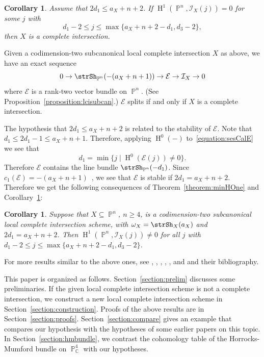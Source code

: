 \documentclass[11pt,a4paper]{amsart}
\theoremstyle{plain}
\newtheorem{corollary}[equation]{Corollary}
\theoremstyle{definition}
\newcommand{\calE}{\mathcal E}
\newcommand{\calI}{\mathcal I}
\newcommand{\complex}{\mathbb{C}}
\DeclareMathOperator{\projective}{\mathbb{P}}
\DeclareMathOperator{\homology}{H}
\begin{document}
\begin{corollary}
\label{corollary:gap}
Assume that $2d_1 \leq a_X+n+2$. If $\homology^1(\projective^n, \calI_X(j))
= 0$ for some $j$ with 
\[
d_1-2 \leq j \leq  \max \{ a_X+n+2-d_1, d_3-2\},
\]
then $X$ is a complete intersection.
\end{corollary}

Given a codimension-two subcanonical local complete intersection $X$ as
above, we have an exact sequence
\begin{equation}
\label{equation:sesCalE} 
0 \to \strSh_{\projective^n}(-(a_X+n+1)) \to \calE \to \calI_X \to 0
\end{equation}
where $\calE$ is a rank-two vector bundle on $\projective^n$.
(See Proposition~\ref{proposition:lcisubcan}.) 
$\calE$ splits if and only if $X$ is a complete intersection.

The hypothesis that $2d_1 \leq a_X + n+2$ is related to the stability of
$\calE$.
Note that $d_1 \leq 2d_1-1 \leq a_X + n + 1$.
Therefore, applying $\homology^0(-)$ to~\eqref{equation:sesCalE} we see
that 
\[
d_1 = \min \{j \mid \homology^0(\calE(j)) \neq 0 \}.
\]
Therefore $\calE$ contains the line bundle $\strSh_{\projective^n}(-d_1)$.
Since $c_1(\calE) = -(a_X+n+1)$~\cite[Chapter~1, 5.1.1]{OSSvb2011},
we see that $\calE$ is stable if $2d_1 = a_X+n+2$.
Therefore we get the following consequences of
Theorem~\ref{theorem:minHOne} and Corollary~\ref{corollary:gap}:

\begin{corollary}
%
Suppose that $X \subseteq \projective^n$, $n \geq 4$,
is a codimension-two subcanonical
local complete intersection scheme, with $\omega_X = \strSh_X(a_X)$
and $2d_1 = a_X+n+2$. Then 
$\homology^1(\projective^n, \calI_X(j ) ) \neq 0$ 
for all $j$ with $d_1-2 \leq j \leq  \max \{ a_X+n+2-d_1, d_3-2\}$.
\end{corollary}

For more results similar to the above ones, see 
\cite{ElliaFrancoCodimTwo2002},
\cite{ElliaSurvey2000},
\cite{ElliaSartikBuchs1999},
\cite{ChiantiniVallabregaSubcanCurves1983},
\cite{ChiantiniVallabregaSubcanCurves1987},
\cite{ChiantiniVBReflShLowCodimVars2006} and
\cite{KumarRaoBuchsbaumBdles2000} and their bibliography.

This paper is organized as follows.
Section~\ref{section:prelim} discusses some preliminaries.
If the given local complete intersection scheme is not a complete
intersection, we construct a new 
local complete intersection scheme in Section~\ref{section:construction}.
Proofs of the above results are in Section~\ref{section:proofs}.
Section~\ref{section:compare} gives an example that compares our hypothesis
with the hypotheses of some earlier papers on this topic.
In Section~\ref{section:hmbundle}, we contrast the cohomology table
of the Horrocks-Mumford bundle on $\projective^4_\complex$ with our hypotheses.
\end{document}
